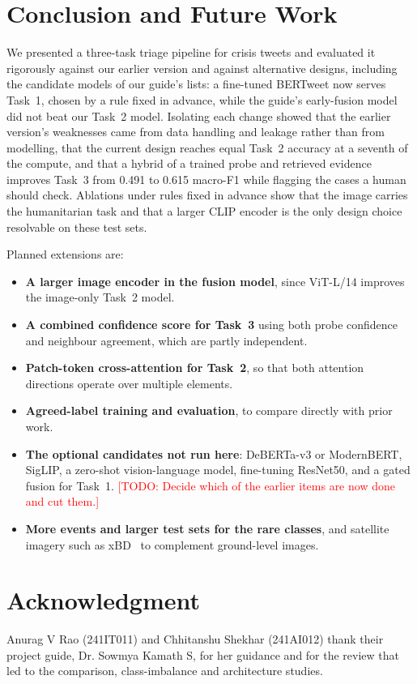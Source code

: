\documentclass[conference]{IEEEtran}
\newcommand{\todo}[1]{\textcolor{red}{[TODO: #1]}}
\begin{document}
\section{Conclusion and Future Work}

We presented a three-task triage pipeline for crisis tweets and evaluated it rigorously against our earlier version and against alternative designs, including the candidate models of our guide's lists: a fine-tuned BERTweet now serves Task~1, chosen by a rule fixed in advance, while the guide's early-fusion model did not beat our Task~2 model. Isolating each change showed that the earlier version's weaknesses came from data handling and leakage rather than from modelling, that the current design reaches equal Task~2 accuracy at a seventh of the compute, and that a hybrid of a trained probe and retrieved evidence improves Task~3 from 0.491 to 0.615 macro-F1 while flagging the cases a human should check. Ablations under rules fixed in advance show that the image carries the humanitarian task and that a larger CLIP encoder is the only design choice resolvable on these test sets.

Planned extensions are:
\begin{itemize}
\item \textbf{A larger image encoder in the fusion model}, since ViT-L/14 improves the image-only Task~2 model.
\item \textbf{A combined confidence score for Task~3} using both probe confidence and neighbour agreement, which are partly independent.
\item \textbf{Patch-token cross-attention for Task~2}, so that both attention directions operate over multiple elements.
\item \textbf{Agreed-label training and evaluation}, to compare directly with prior work.
\item \textbf{The optional candidates not run here}: DeBERTa-v3 or ModernBERT, SigLIP, a zero-shot vision-language model, fine-tuning ResNet50, and a gated fusion for Task~1. \todo{Decide which of the earlier items are now done and cut them.}
\item \textbf{More events and larger test sets for the rare classes}, and satellite imagery such as xBD~\cite{gupta2019} to complement ground-level images.
\end{itemize}

\section*{Acknowledgment}
Anurag V Rao (241IT011) and Chhitanshu Shekhar (241AI012) thank their project guide, Dr. Sowmya Kamath S, for her guidance and for the review that led to the comparison, class-imbalance and architecture studies.
\end{document}
